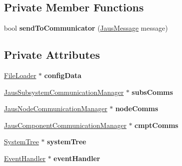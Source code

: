 \subsection*{\-Private \-Member \-Functions}
\begin{DoxyCompactItemize}
\item 
\hypertarget{class_message_router_af1d3afc10ab10c2a5108b79082bafc3a}{bool {\bfseries send\-To\-Communicator} (\hyperlink{struct_jaus_message_struct}{\-Jaus\-Message} message)}\label{class_message_router_af1d3afc10ab10c2a5108b79082bafc3a}

\end{DoxyCompactItemize}
\subsection*{\-Private \-Attributes}
\begin{DoxyCompactItemize}
\item 
\hypertarget{class_message_router_a7af072b3bd915bd244e33991140db265}{\hyperlink{class_file_loader}{\-File\-Loader} $\ast$ {\bfseries config\-Data}}\label{class_message_router_a7af072b3bd915bd244e33991140db265}

\item 
\hypertarget{class_message_router_a8cd2c8683f047d3bbc8699c4ca1d83f1}{\hyperlink{class_jaus_subsystem_communication_manager}{\-Jaus\-Subsystem\-Communication\-Manager} $\ast$ {\bfseries subs\-Comms}}\label{class_message_router_a8cd2c8683f047d3bbc8699c4ca1d83f1}

\item 
\hypertarget{class_message_router_a61e585657248608529300f35e7e1362e}{\hyperlink{class_jaus_node_communication_manager}{\-Jaus\-Node\-Communication\-Manager} $\ast$ {\bfseries node\-Comms}}\label{class_message_router_a61e585657248608529300f35e7e1362e}

\item 
\hypertarget{class_message_router_a01419b0137d999acd6005af61a7f5b34}{\hyperlink{class_jaus_component_communication_manager}{\-Jaus\-Component\-Communication\-Manager} $\ast$ {\bfseries cmpt\-Comms}}\label{class_message_router_a01419b0137d999acd6005af61a7f5b34}

\item 
\hypertarget{class_message_router_ae00ec0a115a698888a0fa91081b3dc44}{\hyperlink{class_system_tree}{\-System\-Tree} $\ast$ {\bfseries system\-Tree}}\label{class_message_router_ae00ec0a115a698888a0fa91081b3dc44}

\item 
\hypertarget{class_message_router_a699936630f0449e033a98ef50390b940}{\hyperlink{class_event_handler}{\-Event\-Handler} $\ast$ {\bfseries event\-Handler}}\label{class_message_router_a699936630f0449e033a98ef50390b940}


\end{DoxyCompactItemize}
